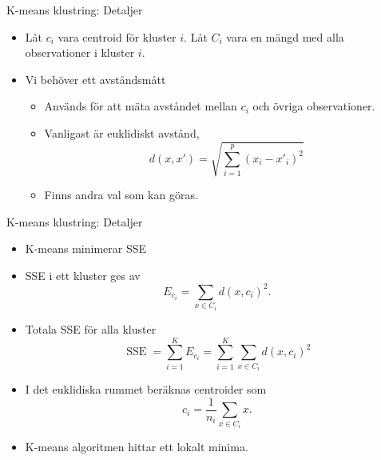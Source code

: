 \documentclass[10pt,english]{beamer}
\begin{document}
\begin{frame}{K-means klustring: Detaljer}

    \begin{itemize}
        \item Låt $c_i$ vara centroid för kluster $i$. Låt $C_i$ vara en mängd med alla observationer i kluster $i$.
        \item Vi behöver ett avståndsmått
        \begin{itemize}
            \item Används för att mäta avståndet mellan $c_i$ och övriga observationer.
            \item Vanligast är euklidiskt avstånd,
            \begin{equation*}
                d(x,x') = \sqrt{\sum_{i=1}^{p}(x_i - x'_i)^2}
            \end{equation*}
            \item Finns andra val som kan göras.
        \end{itemize}
    \end{itemize}
    
\end{frame}



\begin{frame}{K-means klustring: Detaljer}

    \begin{itemize}
        \item K-means minimerar SSE
        \item SSE i ett kluster ges av
        \begin{equation*}
            E_{c_i} = \sum_{x \in C_i} d(x, c_i)^2.
        \end{equation*}
        \item Totala SSE för alla kluster
        \begin{equation*}
            \operatorname{SSE} = \sum_{i=1}^{K} E_{c_i} = \sum_{i=1}^{K} \sum_{x \in C_i} d(x, c_i)^2
        \end{equation*}
        \item I det euklidiska rummet beräknas centroider som
        \begin{equation*}
            c_i = \frac{1}{n_i} \sum_{x \in C_i} x.
        \end{equation*}
        \item K-means algoritmen hittar ett lokalt minima.
    \end{itemize}
    
\end{frame}
\end{document}
